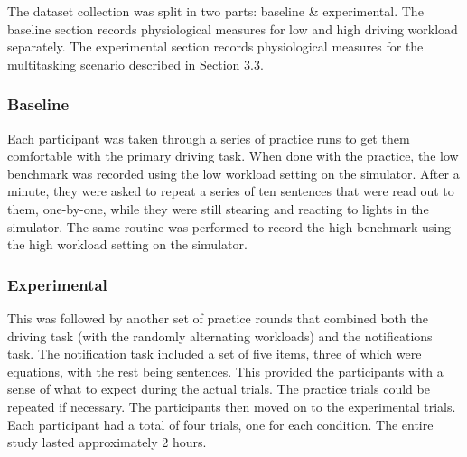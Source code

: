 The dataset collection was split in two parts: baseline \& experimental. The baseline section records physiological measures for low and high driving workload separately. The experimental section records physiological measures for the multitasking scenario described in Section 3.3.  

\subsubsection{Baseline}
Each participant was taken through a series of practice runs to get them comfortable with the primary driving task. When done with the practice, the low benchmark was recorded using the low workload setting on the simulator. After a minute, they were asked to repeat a series of ten sentences that were read out to them, one-by-one, while they were still stearing and reacting to lights in the simulator. The same routine was performed to record the high benchmark using the high workload setting on the simulator. 

\subsubsection{Experimental}
This was followed by another set of practice rounds that combined both the driving task (with the randomly alternating workloads) and the notifications task. The notification task included a set of five items, three of which were equations, with the rest being sentences. This provided the participants with a sense of what to expect during the actual trials. The practice trials could be repeated if necessary. The participants then moved on to the experimental trials. Each participant had a total of four trials, one for each condition. The entire study lasted approximately 2 hours.




